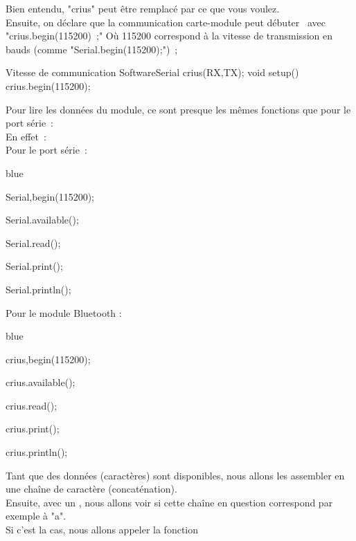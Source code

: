 Bien entendu, "crius" peut être remplacé par ce que vous voulez. \\
Ensuite, on déclare que la communication carte-module peut débuter  avec "crius.begin(115200) ;"
Où 115200 correspond à la vitesse de transmission en bauds (comme "Serial.begin(115200);") ;

\begin{Cpp}{Vitesse de communication}
SoftwareSerial crius(RX,TX);
void setup() {
    crius.begin(115200);
}
\end{Cpp}


Pour lire les données du module, ce sont presque les mêmes fonctions que pour le port série : \\
En effet : \\

Pour le port série :	\\	

\begin{items}{blue}{\Triangle}
    \item Serial,begin(115200);
    \item Serial.available();
    \item Serial.read();	
    \item Serial.print();
    \item Serial.println();
\end{items}

Pour le module Bluetooth : \\

\begin{items}{blue}{\Triangle}
    \item crius,begin(115200);
    \item crius.available();
    \item crius.read();	
    \item crius.print();
    \item crius.println();
    
\end{items}


Tant que des données (caractères) sont disponibles, nous allons les assembler en une chaîne de caractère (concaténation). \\
Ensuite, avec un , nous allons voir si cette chaîne en question correspond par exemple à "a". \\ 
Si c'est la cas, nous allons appeler la fonction  \\


